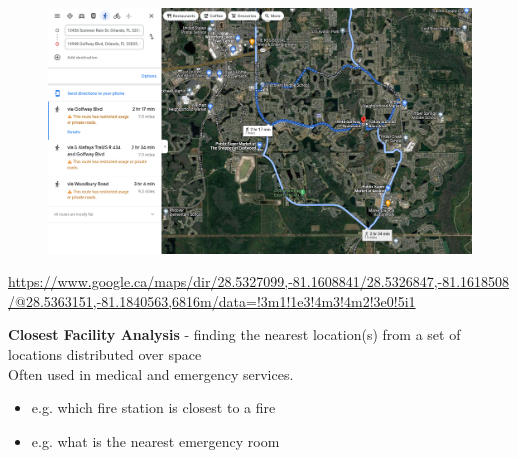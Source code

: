 \documentclass[aspectratio=169]{beamer}
\begin{document}
\begin{frame}
	
	\begin{figure}
		\centering
		\includegraphics[width=0.95 \linewidth]{images/stupid_route_orlando}
	\end{figure}
	\tiny \url{https://www.google.ca/maps/dir/28.5327099,-81.1608841/28.5326847,-81.1618508/@28.5363151,-81.1840563,6816m/data=!3m1!1e3!4m3!4m2!3e0!5i1}
\end{frame}








\begin{frame}

	\textbf{Closest Facility Analysis} - finding the nearest location(s) from a set of locations distributed over space \\
	\vspace{3mm}
	Often used in medical and emergency services. 
	\begin{itemize}
		\item e.g. which fire station is closest to a fire
		\item e.g. what is the nearest emergency room
	\end{itemize}
\end{frame}
\end{document}
